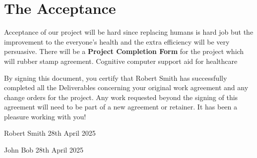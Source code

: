 \documentclass{article}
\begin{document}
\section{The Acceptance}
Acceptance of our project will be hard since replacing humans is hard job but the improvement to the everyone's health and the extra efficiency will be very persuasive. There will be a \textbf{Project Completion Form} for the project which will rubber stamp agreement.
Cognitive computer support aid for healthcare

By signing this document, you certify that Robert Smith has successfully completed all the Deliverables concerning your original work agreement and any change orders for the project. Any work requested beyond the signing of this agreement will need to be part of a new agreement or retainer. 
It has been a pleasure working with you!

\bigskip


Robert Smith
28th April 2025
\bigskip
\bigskip
\bigskip


John Bob
28th April 2025
\end{document}
